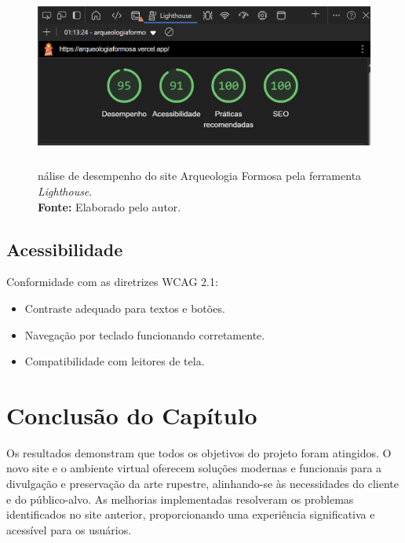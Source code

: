 \begin{figure}[H]
    \centering
    \includegraphics[height=6cm, keepaspectratio]{img/site/lighthouse_only.png}
    \caption{nálise de desempenho do site Arqueologia Formosa pela ferramenta \textit{Lighthouse}. \\
    \textbf{Fonte:} Elaborado pelo autor.}
    \label{fig:site_homepage}
\end{figure}

\subsection{Acessibilidade}
Conformidade com as diretrizes WCAG 2.1:
\begin{itemize}
    \item Contraste adequado para textos e botões.
    \item Navegação por teclado funcionando corretamente.
    \item Compatibilidade com leitores de tela.
\end{itemize}


\section{Conclusão do Capítulo}
Os resultados demonstram que todos os objetivos do projeto foram atingidos. O novo site e o ambiente virtual oferecem soluções modernas e funcionais para a divulgação e preservação da arte rupestre, alinhando-se às necessidades do cliente e do público-alvo. As melhorias implementadas resolveram os problemas identificados no site anterior, proporcionando uma experiência significativa e acessível para os usuários.

